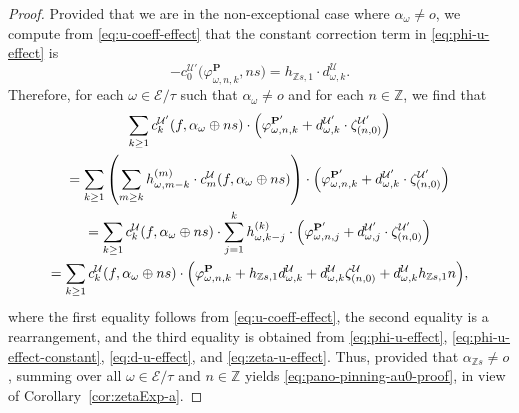 \documentclass[10pt,a4paper]{amsart}
\newcommand{\Z}{\mathbb{Z}} %
\newcommand{\ec}{\mathcal{E}} %
\newcommand{\idec}{{o}} %
\newcommand{\orbita}{{\ec/\tau}} %
\newcommand{\za}[2]{\zeta^{\mathcal{U}}_{( {#1} , {#2} )}}
\begin{document}
\begin{proof}
    Provided that we are in the non-exceptional case where $\alpha_\omega\neq\idec$, we compute from \eqref{eq:u-coeff-effect} that the constant correction term in \eqref{eq:phi-u-effect} is \begin{equation}\label{eq:phi-u-effect-constant}
        -c_0^{\mathcal{U}'}\bigl(\varphi^\mathbf{P}_{\omega,n,k},ns\bigr)=h_{\Z s,1}\cdot d^\mathcal{U}_{\omega,k}.
    \end{equation} Therefore, for each $\omega\in\orbita$ such that $\alpha_\omega\neq\idec$ and for each $n\in \Z$, we find that \begin{multline}\label{eq:pano-pinning-au0-long-computation-nice}
    \sum_{k\geq 1} c^{\mathcal{U}'}_k(f,\alpha_\omega\oplus ns)\cdot\Bigl(\varphi^{\mathbf{P}'}_{\omega,n,k}+d^{\mathcal{U}'}_{\omega,k}\cdot\zeta^{\mathcal{U}'}_{(n,0)}\Bigr)\\
      =\sum_{k\geq 1}\left(\sum_{m\geq k} h^{(m)}_{\omega,m-k}\cdot c^{\mathcal{U}}_m(f,\alpha_\omega\oplus ns)\right)\cdot\Bigl(\varphi^{\mathbf{P}'}_{\omega,n,k}+d^{\mathcal{U}'}_{\omega,k}\cdot\zeta^{\mathcal{U}'}_{(n,0)}\Bigr) \\
      =\sum_{k\geq 1}c_k^\mathcal{U}(f,\alpha_\omega\oplus ns)\cdot\sum_{j=1}^k h^{(k)}_{\omega,k-j}\cdot\Bigl(\varphi^{\mathbf{P}'}_{\omega,n,j}+d^{\mathcal{U}'}_{\omega,j}\cdot\zeta^{\mathcal{U}'}_{(n,0)}\Bigr)\\
      =\sum_{k\geq 1}c_k^\mathcal{U}(f,\alpha_\omega\oplus ns)\cdot\Bigl(\varphi^\mathbf{P}_{\omega,n,k}+h_{\Z s,1}d_{\omega,k}^{\mathcal{U}}+d^\mathcal{U}_{\omega,k}\za{n}{0}+d^{\mathcal{U}}_{\omega,k}h_{\Z s,1}n\Bigr),
    \end{multline} where the first equality follows from \eqref{eq:u-coeff-effect}, the second equality is a rearrangement, and the third equality is obtained from \eqref{eq:phi-u-effect}, \eqref{eq:phi-u-effect-constant},  \eqref{eq:d-u-effect}, and \eqref{eq:zeta-u-effect}. Thus, provided that $\alpha_{\Z s}\neq\idec$, summing over all $\omega\in\orbita$ and $n\in\Z$ yields \eqref{eq:pano-pinning-au0-proof}, in view of Corollary~\ref{cor:zetaExp-a}.


\end{proof}
\end{document}
